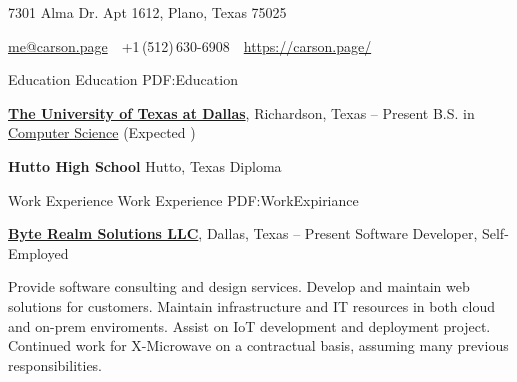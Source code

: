 \documentclass[letterpaper,MMMyyyy,nonstopmode]{simpleresumecv}
\newcommand{\CVAuthor}{Carson Page}
\newcommand{\CVWebpage}{https://carson.page/}
\begin{document}

\Title{\CVAuthor}

\begin{SubTitle}
7301 Alma Dr. Apt 1612, Plano, Texas 75025
\par
\href{mailto:me@carson.page}
{me@carson.page}
\,\SubBulletSymbol\,
+1\,(512)\,630-6908
\,\SubBulletSymbol\,
\href{\CVWebpage}
{\url{\CVWebpage}}
\end{SubTitle}

\begin{Body}


\Section
{Education}
{Education}
{PDF:Education}

\Entry
\href{https://utdallas.edu/}
{\textbf{The University of Texas at Dallas}},
Richardson, Texas
\hfill
{} -- Present
\Gap
\BulletItem
B.S. in
\href{https://cs.utdallas.edu/}
{Computer Science} (Expected )

\BigGap
\Entry
\textbf{Hutto High School}
Hutto, Texas
\hfill
{}
\Gap
\BulletItem Diploma


\Section
{Work Experience}
{Work Experience}
{PDF:WorkExpiriance}


\BigGap
\Entry
\href{https://byterealm.com/}{\textbf{Byte Realm Solutions LLC}},
Dallas, Texas
\hfill
 -- Present
\Gap
Software Developer, Self-Employed
\begin{Detail}
\BulletItem
Provide software consulting and design services.
\BulletItem
Develop and maintain web solutions for customers.
\BulletItem
Maintain infrastructure and IT resources in both cloud and on-prem enviroments.
\BulletItem
Assist on IoT development and deployment project.
\BulletItem
Continued work for X-Microwave on a contractual basis,
assuming many previous responsibilities.
\end{Detail}


\end{Body}
\end{document}
